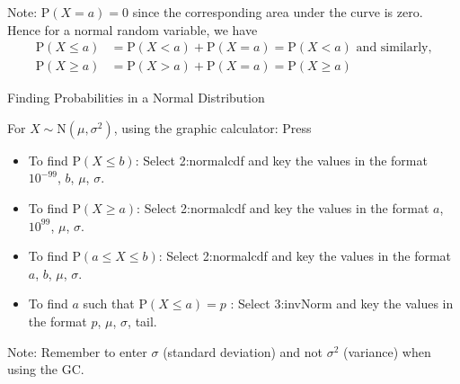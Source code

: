 \documentclass[11pt,a4paper]{book}
\begin{document}
Note: $\text{P}\left(X=a\right)=0$ since the corresponding area under
the curve is zero. Hence for a normal random variable, we have
\begin{align*}
\text{P}\left(X\leq a\right) & =\text{P}\left(X<a\right)+\text{P}\left(X=a\right)=\text{P}\left(X<a\right)\text{ and similarly,}\\
\text{P}\left(X\geq a\right) & =\text{P}\left(X>a\right)+\text{P}\left(X=a\right)=\text{P}\left(X\geq a\right)
\end{align*}

\begin{GC}{Finding Probabilities in a Normal Distribution}

For $X\sim\text{N}\left(\mu,\sigma^{2}\right)$, using the graphic
calculator: Press \tcbox[box align=base,nobeforeafter,colback=blue!40, colframe=blue!40,size=small]{\textbf{\textcolor{white}{2ND}}}\tcbox[box align=base,nobeforeafter,colback=black, colframe=black,size=small]{\textbf{\textcolor{white}{VARS}}}

\begin{itemize}

\item To find $\text{P}\left(X\leq b\right)$: Select 2:normalcdf
and key the values in the format $10^{-99}$, $b$, $\mu$, $\sigma$.

\item  To find $\text{P}\left(X\geq a\right)$: Select 2:normalcdf
and key the values in the format $a$, $10^{99}$, $\mu$, $\sigma$.

\item  To find $\text{P}\left(a\leq X\leq b\right)$: Select 2:normalcdf
and key the values in the format $a$, $b$, $\mu$, $\sigma$.

\item  To find $a$ such that $\text{P}\left(X\leq a\right)=p$ :
Select 3:invNorm and key the values in the format $p$, $\mu$, $\sigma$,
tail.

\end{itemize}

Note: Remember to enter $\sigma$ (standard deviation) and not $\sigma^{2}$ (variance) when using the GC.

\end{GC}

\newpage
\end{document}
